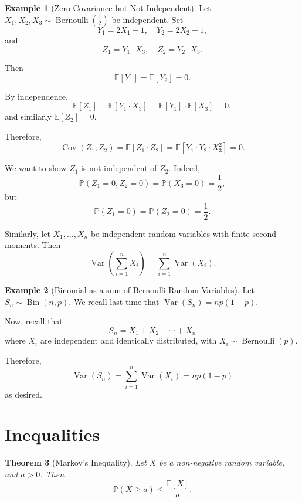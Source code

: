 \documentclass[11pt]{article}
\numberwithin{equation}{section}
\newtheorem{theorem}{Theorem}[section]
\theoremstyle{definition}
\newtheorem{example}[theorem]{Example}
\theoremstyle{remark}
\newcommand{\pqty}[1]{\left(#1\right)}
\newcommand{\bqty}[1]{\left[#1\right]}
\newcommand{\Prob}{\mathbb P}
\newcommand{\Expt}{\mathbb E}
\DeclareMathOperator{\Var}{Var}
\DeclareMathOperator{\Cov}{Cov}
\newcommand{\Bernoulli}{\operatorname{Bernoulli}}
\newcommand{\Binomial}{\operatorname{Bin}}
\begin{document}
\begin{example}[Zero Covariance but Not Independent]\label{probability-example-023}
    \label{probability-ex:zero-variance-no-independent}%
    Let \(X_1, X_2, X_3 \sim \Bernoulli\pqty{\frac{1}{2}}\) be independent. Set
    \[
        Y_1 = 2 X_1 - 1, \quad Y_2 = 2 X_2 - 1,
    \]
    and
    \[
        Z_1 = Y_1 \cdot X_3, \quad Z_2 = Y_2 \cdot X_3.
    \]

    Then
    \[
        \Expt\bqty{Y_1} = \Expt\bqty{Y_2} = 0.
    \]

    By independence,
    \[
        \Expt\bqty{Z_1} = \Expt\bqty{Y_1 \cdot X_3} = \Expt\bqty{Y_1} \cdot \Expt\bqty{X_3} = 0,
    \]
    and similarly \(\Expt\bqty{Z_2} = 0\).

    Therefore,
    \[
        \Cov\pqty{Z_1, Z_2} = \Expt\bqty{Z_1 \cdot Z_2} = \Expt\bqty{Y_1 \cdot Y_2 \cdot X_3^2} = 0.
    \]

    We want to show \(Z_1\) is not independent of \(Z_2\). Indeed,
    \[
        \Prob\pqty{Z_1 = 0, Z_2 = 0} = \Prob\pqty{X_3 = 0} = \frac{1}{2},
    \]
    but
    \[
        \Prob\pqty{Z_1 = 0} = \Prob\pqty{Z_2 = 0} = \frac{1}{2}.
    \]
\end{example}

Similarly, let \(X_1, \ldots, X_n\) be independent random variables with finite second moments. Then
\[
    \Var\pqty{\sum_{i = 1}^{n} X_i} = \sum_{i = 1}^{n} \Var\pqty{X_i}.
\]

\begin{example}[Binomial as a sum of Bernoulli Random Variables]\label{probability-example-024}
    \label{probability-ex:binomial-sum-bernoulli}%
    Let \(S_n \sim \Binomial\pqty{n, p}\). We recall last time that \(\Var\pqty{S_n} = n p \pqty{1 - p}\).

    Now, recall that
    \[
        S_n = X_1 + X_2 + \cdots + X_n
    \]
    where \(X_i\) are independent and identically distributed, with \(X_i \sim \Bernoulli\pqty{p}\).

    Therefore,
    \[
        \Var\pqty{S_n} = \sum_{i = 1}^{n} \Var\pqty{X_i} = np \pqty{1 - p}
    \]
    as desired.
\end{example}

\section{Inequalities}\label{probability-section-06}

\begin{theorem}[Markov's Inequality]\label{probability-theorem-005}
    \label{probability-thm:markov-inequality}%
    Let \(X\) be a non-negative random variable, and \(a > 0\). Then
    \[
        \Prob\pqty{X \geq a} \leq \frac{\Expt\bqty{X}}{a}.
    \]
\end{theorem}
\end{document}
